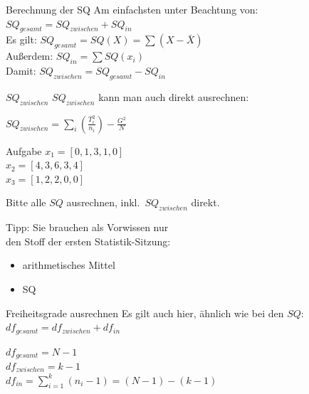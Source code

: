 \begin{frame}
  {Berechnung der SQ}
  Am einfachsten unter Beachtung von:\\
  \alert{$SQ_{gesamt}=SQ_{zwischen}+SQ_{in}$}\\

  \vspace{0.5cm}
  \pause
  Es gilt: \alert{$SQ_{gesamt}=SQ(X)=\sum(X-\bar{X})$}\\
  
  \vspace{0.5cm}
  \pause
  Außerdem: \alert{$SQ_{in}=\sum SQ(x_i)$}\\
  
  \vspace{0.5cm}
  \pause
  Damit: \alert{$SQ_{zwischen}=SQ_{gesamt}-SQ_{in}$}\\
\end{frame}

\begin{frame}
  {$SQ_{zwischen}$}
  $SQ_{zwischen}$ kann man auch direkt ausrechnen:

  \vspace{0.5cm}
  \begin{center}
    $SQ_{zwischen}=\sum\limits_i(\frac{T_i^2}{n_i})-\frac{G^2}{N}$
  \end{center}
\end{frame}


\begin{frame}
  {Aufgabe}
  $x_1=[0, 1, 3, 1, 0]$\\
  $x_2=[4, 3, 6, 3, 4]$\\
  $x_3=[1, 2, 2, 0, 0]$\\

  \begin{center}
    Bitte alle $SQ$ ausrechnen, inkl.\ $SQ_{zwischen}$ direkt.
  \end{center}

  \vspace{0.5cm}
  \scriptsize
  Tipp: Sie brauchen als Vorwissen \alert{nur}\\
  den Stoff der ersten Statistik-Sitzung:
  \begin{itemize}
    \item arithmetisches Mittel
    \item SQ
  \end{itemize}
\end{frame}

\begin{frame}
  {Freiheitsgrade ausrechnen}
  Es gilt auch hier, ähnlich wie bei den $SQ$:\\
  \alert{$df_{gesamt}=df_{zwischen}+df_{in}$}

  \vspace{0.5cm}
  $df_{gesamt}=N-1$\\[2ex]
  $df_{zwischen}=k-1$\\[2ex]
  $df_{in}=\sum\limits_{i=1}^{k}(n_i-1)=(N-1)-(k-1)$
\end{frame}

